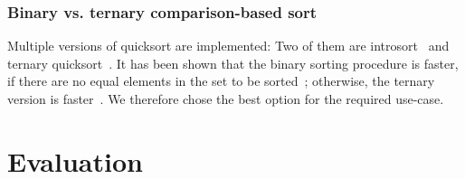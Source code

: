 \subsubsection{Binary vs. ternary comparison-based sort}

Multiple versions of quicksort are implemented:
Two of them are introsort~\cite{Musser97} and ternary quicksort~\cite{ternary_quicksort}.
It has been shown that the binary sorting procedure is faster,
if there are no equal elements in the set to be sorted~\cite{saca:4,ternary_quicksort};
otherwise, the ternary version is faster~\cite{ternary_quicksort}.
We therefore chose the best option for the required use-case.

\section{Evaluation}

